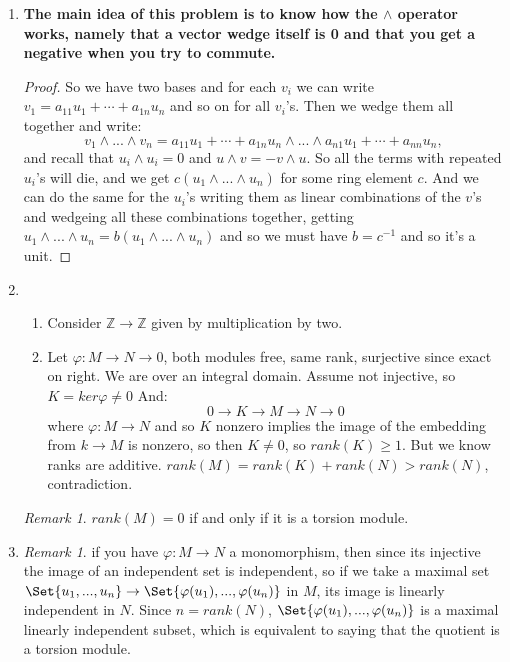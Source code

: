 \documentclass[9pt,reqno,twoside]{amsbook}
\theoremstyle{plain}
\numberwithin{section}{chapter}
\numberwithin{equation}{chapter}
\theoremstyle{definition}
\theoremstyle{remark}
\newtheorem{rem}[theorem]{Remark}
\theoremstyle{plain}
\newcommand{\z}{\mathbb{Z}}
\renewcommand{\geq}{\geqslant}
\renewcommand{\phi}{\varphi}
\begin{document}
\begin{enumerate}[label=\arabic*.]
 
 \item \textit{}
 
 \textbf{The main idea of this problem is to know how the $\wedge$ operator works, namely that a vector wedge itself is 0 and that you get a negative when you try to commute. }
 
 \begin{proof}
 So we have two bases and for each $v_i$ we can write $v_1 = a_{11}u_1 + \cdots + a_{1n}u_n$ and so on for all $v_i$'s. Then we wedge them all together and write:
 $$
 v_1 \wedge ... \wedge v_n = a_{11}u_1 + \cdots + a_{1n}u_n \wedge ... \wedge a_{n1}u_1 + \cdots + a_{nn}u_n,
 $$
 and recall that $u_i \wedge u_i = 0$ and $u \wedge v = -v \wedge u$. So all the terms with repeated $u_i$'s will die, and we get $c(u_1 \wedge ... \wedge u_n)$ for some ring element $c$. And we can do the same for the $u_i$'s writing them as linear combinations of the $v$'s and wedgeing all these combinations together, getting $u_1 \wedge ... \wedge u_n = b(u_1 \wedge ... \wedge u_n)$ and so we must have $b = c^{-1}$ and so it's a unit. 
 \end{proof}

\setcounter{enumi}{7}

\item 
\begin{enumerate}
\item Consider $\z \to \z$ given by multiplication by two. 


\item Let $\phi:M \to N \to 0$, both modules free, same rank, surjective since exact on right. We are over an integral domain. Assume not injective, so $K = ker\phi \neq 0$ And:
$$
0 \to K \to M \to N \to 0
$$
 where $\phi:M \to N$ and so $K$ nonzero implies the image of the embedding from $k \to M$ is nonzero, so then $K\neq 0$, so $rank(K) \geq 1$. But we know ranks are additive. $rank(M) = rank(K) + rank(N) > rank(N)$, contradiction. 
\end{enumerate}

\begin{rem}
$rank(M) = 0$ if and only if it is a torsion module. 
\end{rem}

\item 

\begin{rem}
if you have $\phi:M \to N$ a monomorphism, then since its injective the image of an independent set is independent, so if we take a maximal set $\Set{u_1,...,u_n} \to \Set{\phi(u_1),...,\phi(u_n)}$ in $M$, its image is linearly independent in $N$. Since $n = rank(N)$, $\Set{\phi(u_1),...,\phi(u_n)}$ is a maximal linearly independent subset, which is equivalent to saying that the quotient is a torsion module. 
\end{rem}


\end{enumerate}
\end{document}
